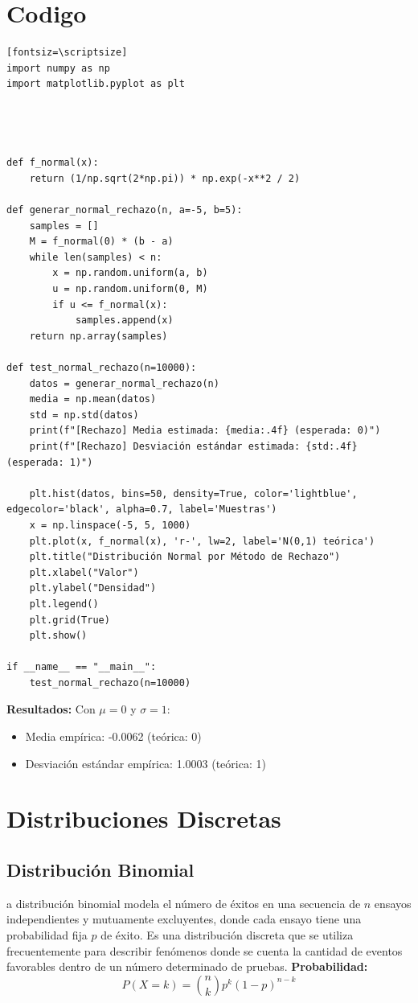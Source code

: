 \documentclass{article}
\begin{document}
\section{Codigo}
    \begin{verbatim}[fontsiz=\scriptsize]
import numpy as np
import matplotlib.pyplot as plt




def f_normal(x):
    return (1/np.sqrt(2*np.pi)) * np.exp(-x**2 / 2)

def generar_normal_rechazo(n, a=-5, b=5):
    samples = []
    M = f_normal(0) * (b - a)
    while len(samples) < n:
        x = np.random.uniform(a, b)
        u = np.random.uniform(0, M)
        if u <= f_normal(x):
            samples.append(x)
    return np.array(samples)

def test_normal_rechazo(n=10000):
    datos = generar_normal_rechazo(n)
    media = np.mean(datos)
    std = np.std(datos)
    print(f"[Rechazo] Media estimada: {media:.4f} (esperada: 0)")
    print(f"[Rechazo] Desviación estándar estimada: {std:.4f} (esperada: 1)")

    plt.hist(datos, bins=50, density=True, color='lightblue', edgecolor='black', alpha=0.7, label='Muestras')
    x = np.linspace(-5, 5, 1000)
    plt.plot(x, f_normal(x), 'r-', lw=2, label='N(0,1) teórica')
    plt.title("Distribución Normal por Método de Rechazo")
    plt.xlabel("Valor")
    plt.ylabel("Densidad")
    plt.legend()
    plt.grid(True)
    plt.show()

if __name__ == "__main__":
    test_normal_rechazo(n=10000)
    \end{verbatim}

\textbf{Resultados:} Con $\mu=0$ y $\sigma=1$:
\begin{itemize}
\item Media empírica: -0.0062 (teórica: 0)
\item Desviación estándar empírica: 1.0003 (teórica: 1)
\end{itemize}

\section{Distribuciones Discretas}

\subsection{Distribución Binomial}
a distribución binomial modela el número de éxitos en una secuencia de $n$ ensayos independientes y mutuamente excluyentes, donde cada ensayo tiene una probabilidad fija $p$ de éxito. Es una distribución discreta que se utiliza frecuentemente para describir fenómenos donde se cuenta la cantidad de eventos favorables dentro de un número determinado de pruebas.
\textbf{Probabilidad:}
\begin{equation}
P(X = k) = \binom{n}{k} p^k (1-p)^{n-k}
\end{equation}
\end{document}

